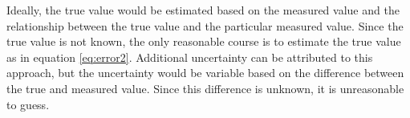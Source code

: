 Ideally, the true value would be estimated based on the measured value and the relationship between the true value and the particular measured value.  Since the true value is not known, the only reasonable course is to estimate the true value as in equation \ref{eq:error2}.  Additional uncertainty can be attributed to this approach, but the uncertainty would be variable based on the difference between the true and measured value.  Since this difference is unknown, it is unreasonable to guess.